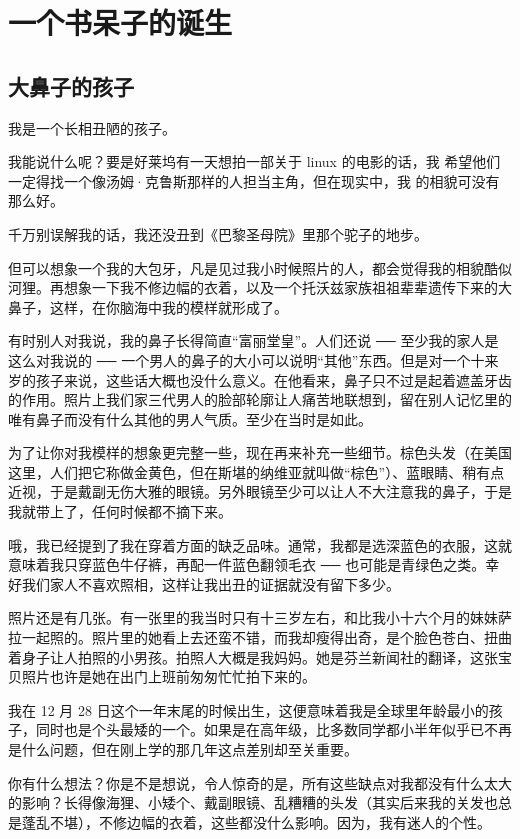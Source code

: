 \chapter{一个书呆子的诞生}
\section{大鼻子的孩子}

我是一个长相丑陋的孩子。

我能说什么呢？要是好莱坞有一天想拍一部关于 linux 的电影的话，我
希望他们一定得找一个像汤姆·克鲁斯那样的人担当主角，但在现实中，我
的相貌可没有那么好。

千万别误解我的话，我还没丑到《巴黎圣母院》里那个驼子的地步。

但可以想象一个我的大包牙，凡是见过我小时候照片的人，都会觉得我的相貌酷似河狸。再想象一下我不修边幅的衣着，以及一个托沃兹家族祖祖辈辈遗传下来的大鼻子，这样，在你脑海中我的模样就形成了。

有时别人对我说，我的鼻子长得简直“富丽堂皇”。人们还说 ── 至少我的家人是这么对我说的 ── 一个男人的鼻子的大小可以说明“其他”东西。但是对一个十来岁的孩子来说，这些话大概也没什么意义。在他看来，鼻子只不过是起着遮盖牙齿的作用。照片上我们家三代男人的脸部轮廓让人痛苦地联想到，留在别人记忆里的唯有鼻子而没有什么其他的男人气质。至少在当时是如此。

为了让你对我模样的想象更完整一些，现在再来补充一些细节。棕色头发（在美国这里，人们把它称做金黄色，但在斯堪的纳维亚就叫做“棕色”）、蓝眼睛、稍有点近视，于是戴副无伤大雅的眼镜。另外眼镜至少可以让人不大注意我的鼻子，于是我就带上了，任何时候都不摘下来。

哦，我已经提到了我在穿着方面的缺乏品味。通常，我都是选深蓝色的衣服，这就意味着我只穿蓝色牛仔裤，再配一件蓝色翻领毛衣 ── 也可能是青绿色之类。幸好我们家人不喜欢照相，这样让我出丑的证据就没有留下多少。

照片还是有几张。有一张里的我当时只有十三岁左右，和比我小十六个月的妹妹萨拉一起照的。照片里的她看上去还蛮不错，而我却瘦得出奇，是个脸色苍白、扭曲着身子让人拍照的小男孩。拍照人大概是我妈妈。她是芬兰新闻社的翻译，这张宝贝照片也许是她在出门上班前匆匆忙忙拍下来的。

我在 12 月 28 日这个一年末尾的时候出生，这便意味着我是全球里年龄最小的孩子，同时也是个头最矮的一个。如果是在高年级，比多数同学都小半年似乎已不再是什么问题，但在刚上学的那几年这点差别却至关重要。

你有什么想法？你是不是想说，令人惊奇的是，所有这些缺点对我都没有什么太大的影响？长得像海狸、小矮个、戴副眼镜、乱糟糟的头发（其实后来我的关发也总是蓬乱不堪），不修边幅的衣着，这些都没什么影响。因为，我有迷人的个性。

